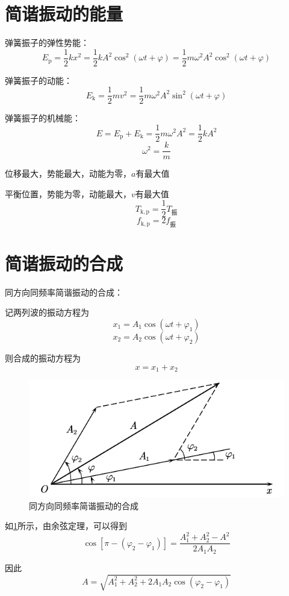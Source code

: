\documentclass[12pt, a4paper, twoside]{ctexbook}
\begin{document}
\section{简谐振动的能量}
{\sonti 弹簧振子的弹性势能}：
$$
E_{\mathrm{p}}=\frac{1}{2}kx^2=\frac{1}{2}kA^2\cos^2\left(\omega t+\varphi\right)=\frac{1}{2}m\omega^2A^2\cos^2\left(\omega t+\varphi\right)
$$

{\sonti 弹簧振子的动能}：
$$
E_{\mathrm{k}}=\frac{1}{2}mv^2=\frac{1}{2}m\omega^2 A^2\sin^2\left(\omega t+\varphi\right)
$$

{\sonti 弹簧振子的机械能}：
$$
E=E_{\mathrm{p}}+E_{\mathrm{k}}=\frac{1}{2}m\omega^2A^2=\frac{1}{2}kA^2
$$
$$
\omega^2=\frac{k}{m}
$$

位移最大，势能最大，动能为零，$a$有最大值

平衡位置，势能为零，动能最大，$v$有最大值
$$
T_\mathrm{k,p}=\frac{1}{2}T_\text{振}
$$
$$
f_\mathrm{k,p}=2f_\text{振}
$$
\section{简谐振动的合成}
{\sonti 同方向同频率简谐振动的合成}：

记两列波的振动方程为
$$
x_1=A_1\cos\left(\omega t+\varphi_1\right)
$$
$$
x_2=A_2\cos\left(\omega t+\varphi_2\right)
$$

则合成的振动方程为
$$
x=x_1+x_2
$$
\begin{figure}[H]
    \centerline{\includegraphics[scale=0.88]{同方向同频率简谐振动的合成.pdf}}
    \caption{同方向同频率简谐振动的合成}\label{fig:同方向同频率简谐振动的合成}
\end{figure}
如\textcolor{blue}{\cref{fig:同方向同频率简谐振动的合成}}所示，由余弦定理，可以得到
$$
\cos\left[\pi-\left(\varphi_2-\varphi_1\right)\right]=\frac{A_1^2+A_2^2-A^2}{2A_1A_2}
$$

因此
$$
A=\sqrt{A_1^2+A_2^2+2A_1A_2\cos\left(\varphi_2-\varphi_1\right)}
$$
\end{document}
